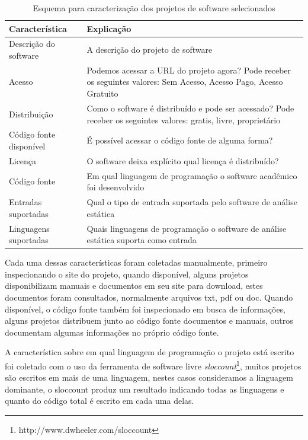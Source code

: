 \begin{table}[h]
\caption{Esquema para caracterização dos projetos de software selecionados}
\centering
\begin{tabular}{ l p{11cm} }
  \hline
  Característica           & Explicação \\
  \hline
  Descrição do software    & A descrição do projeto de software \\
  Acesso                   & Podemos acessar a URL do projeto agora? Pode receber os seguintes valores: Sem Acesso, Acesso Pago, Acesso Gratuito \\
  Distribuição             & Como o software é distribuído e pode ser acessado? Pode receber os seguintes valores: gratis, livre, proprietário \\
  Código fonte disponível  & É possível acessar o código fonte de alguma forma? \\
  Licença                  & O software deixa explícito qual licença é distribuído? \\
  Código fonte             & Em qual linguagem de programação o software acadêmico foi desenvolvido \\
  Entradas suportadas      & Qual o tipo de entrada suportada pelo software de análise estática \\
  Linguagens suportadas    & Quais linguagens de programação o software de análise estática suporta como entrada \\
  \hline
\end{tabular}
\label{esquema-caracteristicas}
\end{table}

Cada uma dessas características foram coletadas manualmente, primeiro
inspecionando o site do projeto, quando disponível, alguns projetos
disponibilizam manuais e documentos em seu site para download, estes documentos
foram consultados, normalmente arquivos txt, pdf ou doc. Quando disponível,
o código fonte também foi inspecionado em busca de informações, alguns projetos
distribuem junto ao código fonte documentos e manuais, outros documentam
algumas informações no próprio código fonte.

A característica sobre em qual linguagem de programação o projeto está escrito
foi coletado com o uso da ferramenta de software livre {\it
sloccount}\footnote{http://www.dwheeler.com/sloccount}, muitos projetos são
escritos em mais de uma linguagem, nestes casos consideramos a linguagem
dominante, o sloccount produz um resultado indicando todas as linguagens e
quanto do código total é escrito em cada uma delas.

